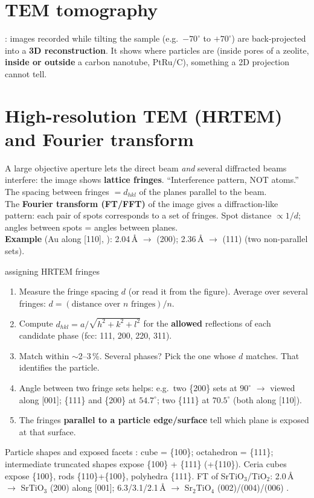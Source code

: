 \section{TEM tomography}
: images recorded while tilting the sample (e.g.\ $-70^\circ$ to $+70^\circ$) are back-projected into a
\textbf{3D reconstruction}. It shows where particles are (inside pores of a zeolite, \textbf{inside or outside} a carbon
nanotube, PtRu/C), something a 2D projection cannot tell.

\section{High-resolution TEM (HRTEM) and Fourier transform}
\begin{keybox}
A large objective aperture lets the direct beam \emph{and} several diffracted beams interfere: the image shows
\textbf{lattice fringes}. ``Interference pattern, NOT atoms.'' The spacing between fringes $= d_{hkl}$ of the planes
parallel to the beam.\\
The \textbf{Fourier transform (FT/FFT)} of the image gives a diffraction-like pattern: each pair of spots corresponds to a
set of fringes. Spot distance $\propto 1/d$; angles between spots = angles between planes.\\
\textbf{Example} (Au along [110], ): 2.04\,\AA{} $\to$ (200); 2.36\,\AA{} $\to$ (111) (two non-parallel sets).
\end{keybox}
\begin{recipe}{assigning HRTEM fringes}
\begin{enumerate}
  \item Measure the fringe spacing $d$ (or read it from the figure). Average over several fringes: $d = (\text{distance over }n\text{ fringes})/n$.
  \item Compute $d_{hkl} = a/\sqrt{h^2+k^2+l^2}$ for the \textbf{allowed} reflections of each candidate phase
        (fcc: 111, 200, 220, 311).
  \item Match within $\sim$2--3\,\%. Several phases? Pick the one whose $d$ matches. That identifies the particle.
  \item Angle between two fringe sets helps: e.g.\ two \{200\} sets at $90^\circ$ $\to$ viewed along [001];
        \{111\} and \{200\} at $54.7^\circ$; two \{111\} at $70.5^\circ$ (both along [110]).
  \item The fringes \textbf{parallel to a particle edge/surface} tell which plane is exposed at that surface.
\end{enumerate}
\end{recipe}
Particle shapes and exposed facets : cube = \{100\}; octahedron = \{111\}; intermediate truncated shapes
expose \{100\} + \{111\} (+\{110\}). Ceria cubes expose \{100\}, rods \{110\}+\{100\}, polyhedra \{111\}.
FT of SrTiO$_3$/TiO$_2$: 2.0\,\AA{} $\to$ SrTiO$_3$ (200) along [001]; 6.3/3.1/2.1\,\AA{} $\to$ Sr$_2$TiO$_4$ (002)/(004)/(006)
.


